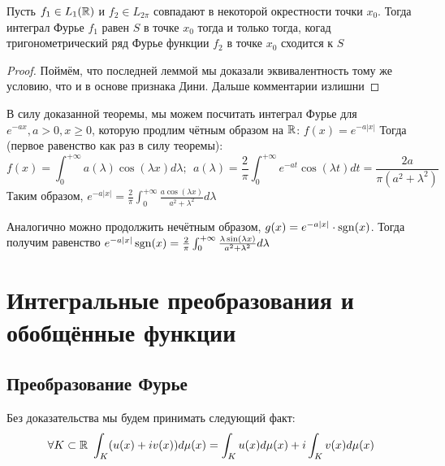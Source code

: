 \begin{theorem}
	Пусть $f_1 \in L_1(\mathbb{R})$ и $f_2 \in L_{2\pi}$ совпадают в некоторой окрестности точки $x_0$. Тогда интеграл Фурье $f_1$ равен $S$ в точке $x_0$ тогда и только тогда, когад тригонометрический ряд Фурье функции $f_2$ в точке $x_0$ сходится к $S$
\end{theorem}

\begin{proof}
	Поймём, что последней леммой мы доказали эквивалентность тому же условию, что и в основе признака Дини. Дальше комментарии излишни
\end{proof}

\begin{example}
	В силу доказанной теоремы, мы можем посчитать интеграл Фурье для $e^{-ax}, a > 0, x \ge 0$, которую продлим чётным образом на $\mathbb{R}$: $f(x) = e^{-a|x|}$ Тогда (первое равенство как раз в силу теоремы):
	\[
		f(x) = \int_0^{+\infty} a(\lambda)\cos(\lambda x)d\lambda;\ \ a(\lambda) = \frac{2}{\pi} \int_0^{+\infty} e^{-at}\cos(\lambda t)dt = \frac{2a}{\pi(a^2 + \lambda^2)}
	\]
	Таким образом, $e^{-a|x|} = \frac{2}{\pi} \int_0^{+\infty} \frac{a\cos(\lambda x)}{a^2 + \lambda^2}d\lambda$
	
	Аналогично можно продолжить нечётным образом, $g(x) = e^{-a|x|} \cdot \operatorname{sgn}(x)$. Тогда получим равенство $e^{-a|x|} \operatorname{sgn}(x) = \frac{2}{\pi} \int_0^{+\infty} \frac{\lambda \sin(\lambda x)}{a^2 + \lambda^2}d\lambda$
\end{example}

\section{Интегральные преобразования и обобщённые функции}

\subsection{Преобразование Фурье}

\begin{note}
	Без доказательства мы будем принимать следующий факт:
	\[
		\forall K \subset \mathbb{R}\ \int_K (u(x) + iv(x))d\mu(x) = \int_K u(x)d\mu(x) + i\int_K v(x)d\mu(x)
	\]
\end{note}

